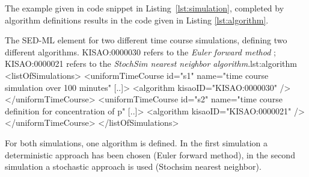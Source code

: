 The example given in code snippet in Listing~\ref{lst:simulation}, completed by algorithm definitions results in the code given in Listing \ref{lst:algorithm}.
%
\begin{myXmlLst}{The SED-ML  element for two different time course simulations, defining two different algorithms. KISAO:0000030 refers to the \emph{Euler forward method} ; KISAO:0000021 refers to the \emph{StochSim nearest neighbor algorithm}.}{lst:algorithm}
<listOfSimulations>
 <uniformTimeCourse id="s1" name="time course simulation over 100 minutes" [..]>
  <algorithm kisaoID="KISAO:0000030" />
 </uniformTimeCourse>
 <uniformTimeCourse id="s2" name="time course definition for concentration of p" [..]>
  <algorithm kisaoID="KISAO:0000021" />
 </uniformTimeCourse>
</listOfSimulations>
\end{myXmlLst}
%
For both simulations, one algorithm is defined. In the first simulation  a deterministic approach has been chosen (Euler forward method), in the second simulation  a stochastic approach is used (Stochsim nearest neighbor).

